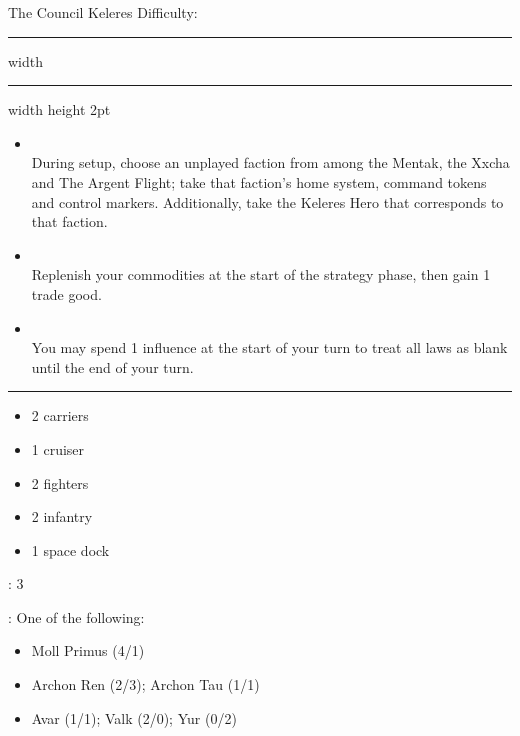 {\handel\Huge The Council Keleres} \hfill {\Large Difficulty: \medium} \vspace{-4pt}\\
\hrule width \hsize \kern 1mm \hrule width \hsize height 2pt


\begin{multicols}{2}


\begin{itemize}
\item {}\\
During setup, choose an unplayed faction from among the {Mentak}, the {Xxcha} and {The Argent Flight}; take that faction's home system, command tokens and control markers. Additionally, take the Keleres Hero that corresponds to that faction.
\item {}\\
Replenish your commodities at the start of the strategy phase, then gain 1 {trade good}.
\item {}\\
You may spend 1 influence at the start of your turn to treat all laws as blank until the end of your turn.
\end{itemize}


\vspace{-10pt}\rule{\hsize}{0.4pt}\vspace{5pt}


\vspace{-5pt}
\begin{multicols}{2}
\begin{itemize}
\item 2 carriers
\item 1 cruiser
\item 2 fighters
\item 2 infantry
\item 1 space dock
\end{itemize}
\end{multicols}

\vspace{-5pt}
: 3

\vspace{2pt}
: One of the following:
\begin{itemize}
\item {} Moll Primus (4/1)
\item {} Archon Ren (2/3); Archon Tau (1/1)
\item {} Avar (1/1); Valk (2/0); Yur (0/2)
\end{itemize}


\end{multicols}
